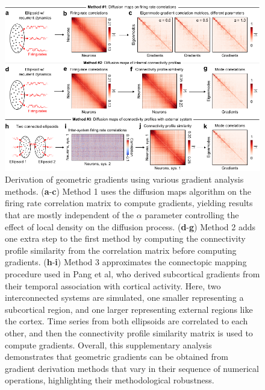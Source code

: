 \documentclass{article}
\begin{document}
\begin{figure}[t]
    \centering
    \includegraphics[width=1.0\linewidth]{figures/supp_gradient_methods.pdf}
    \caption{Derivation of geometric gradients using various gradient analysis methods. (\textbf{a}-\textbf{c}) Method 1 uses the diffusion maps algorithm on the firing rate correlation matrix to compute gradients, yielding results that are mostly independent of the $\alpha$ parameter controlling the effect of local density on the diffusion process. (\textbf{d}-\textbf{g}) Method 2 adds one extra step to the first method by computing the connectivity profile similarity from the correlation matrix before computing gradients. (\textbf{h}-\textbf{i}) Method 3 approximates the connectopic mapping procedure used in Pang et al\cite{pang2023geometric}, who derived subcortical gradients from their temporal association with cortical activity. Here, two interconnected systems are simulated, one smaller representing a subcortical region, and one larger representing external regions like the cortex. Time series from both ellipsoids are correlated to each other, and then the connectivity profile similarity matrix is used to compute gradients. Overall, this supplementary analysis demonstrates that geometric gradients can be obtained from gradient derivation methods that vary in their sequence of numerical operations, highlighting their methodological robustness.}
    \label{supp_methods}
\end{figure}

\newpage
\end{document}
